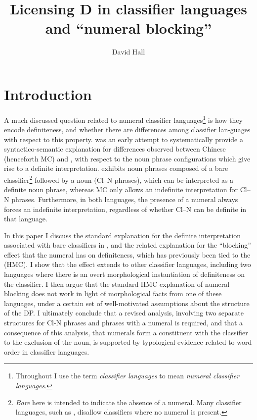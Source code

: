 \documentclass[output=paper
,modfonts
,nonflat]{langsci/langscibook}
\title{Licensing D in classifier languages and ``numeral blocking''}
\author{%
	David Hall\affiliation{Queen Mary University of London}
}
\begin{document}
\maketitle\settowidth\jamwidth{}

\section{Introduction}

A much discussed question related to numeral classifier languages\footnote{Throughout I use the term \textit{classifier languages} to mean \textit{numeral classifier languages}.} is how they encode definiteness, and whether there are differences among classifier lan-\linebreak guages with respect to this property. \citet{ChengSybesma1999} was an early attempt to systematically provide a syntactico-semantic explanation for differen\-ces observed between  Chinese (henceforth MC) and , with respect to the noun phrase configurations which give rise to a definite interpretation.  exhibits noun phrases composed of a bare classifier\footnote{\textit{Bare} here is intended to indicate the absence of a numeral. Many classifier languages, such as , disallow classifiers where no numeral is present.} followed by a noun (Cl--N phrases), which can be interpreted as a definite noun phrase, whereas MC only allows an indefinite interpretation for Cl--N phrases. Furthermore, in both languages, the presence of a numeral always forces an indefinite interpretation, regardless of whether Cl--N can be definite in that language. 

In this paper I discuss the standard explanation for the definite interpretation associated with bare classifiers in , and the related explanation for the ``blocking'' effect that the numeral has on definiteness, which has previously been tied to the  (HMC). I show that the  effect extends to other classifier languages, including two languages where there is an overt morphological instantiation of definiteness on the classifier. I then argue that the standard HMC explanation of numeral blocking does not work in light of morphological facts from one of these languages, under a certain set of well-motivated assumptions about the structure of the DP. I ultimately conclude that a revised analysis, involving two separate structures for Cl-N phrases and phrases with a numeral is required, and that a consequence of this analysis, that numerals form a constituent with the classifier to the exclusion of the noun, is supported by typological evidence related to word order in classifier languages.
\end{document}
